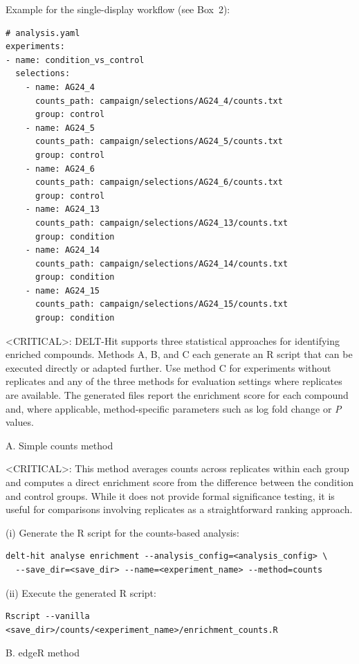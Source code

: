 Example for the single-display workflow (see Box~2):

\begin{lstlisting}
# analysis.yaml
experiments:
- name: condition_vs_control
  selections:
    - name: AG24_4
      counts_path: campaign/selections/AG24_4/counts.txt
      group: control
    - name: AG24_5
      counts_path: campaign/selections/AG24_5/counts.txt
      group: control
    - name: AG24_6
      counts_path: campaign/selections/AG24_6/counts.txt
      group: control
    - name: AG24_13
      counts_path: campaign/selections/AG24_13/counts.txt
      group: condition
    - name: AG24_14
      counts_path: campaign/selections/AG24_14/counts.txt
      group: condition
    - name: AG24_15
      counts_path: campaign/selections/AG24_15/counts.txt
      group: condition
\end{lstlisting}

<CRITICAL>: DELT-Hit supports three statistical approaches for identifying enriched compounds. Methods A, B, and C each generate an R script that can be executed directly or adapted further. Use method C for experiments without replicates and any of the three methods for evaluation settings where replicates are available. The generated files report the enrichment score for each compound and, where applicable, method-specific parameters such as log fold change or \textit{P} values.

A. Simple counts method

<CRITICAL>: This method averages counts across replicates within each group and computes a direct enrichment score from the difference between the condition and control groups. While it does not provide formal significance testing, it is useful for comparisons involving replicates as a straightforward ranking approach.

(i) Generate the R script for the counts-based analysis:
\begin{lstlisting}
delt-hit analyse enrichment --analysis_config=<analysis_config> \
  --save_dir=<save_dir> --name=<experiment_name> --method=counts
\end{lstlisting}

(ii) Execute the generated R script:
\begin{lstlisting}
Rscript --vanilla <save_dir>/counts/<experiment_name>/enrichment_counts.R
\end{lstlisting}


B. edgeR method

